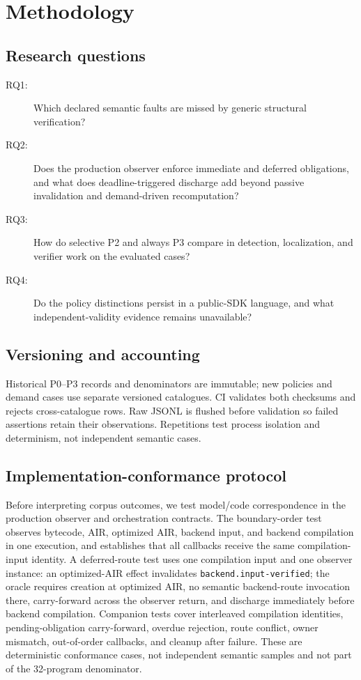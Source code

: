 \section{Methodology}
\subsection{Research questions}
\begin{description}
 \item[RQ1:] Which declared semantic faults are missed by generic structural verification?
 \item[RQ2:] Does the production observer enforce immediate and deferred obligations, and what does deadline-triggered discharge add beyond passive invalidation and demand-driven recomputation?
 \item[RQ3:] How do selective P2 and always P3 compare in detection, localization, and verifier work on the evaluated cases?
 \item[RQ4:] Do the policy distinctions persist in a public-SDK language, and what independent-validity evidence remains unavailable?
\end{description}

\subsection{Versioning and accounting}
Historical P0--P3 records and denominators are immutable; new policies and demand cases use separate versioned catalogues. CI validates both checksums and rejects cross-catalogue rows. Raw JSONL is flushed before validation so failed assertions retain their observations. Repetitions test process isolation and determinism, not independent semantic cases.

\subsection{Implementation-conformance protocol}
Before interpreting corpus outcomes, we test model/code correspondence in the production observer and orchestration contracts. The boundary-order test observes bytecode, AIR, optimized AIR, backend input, and backend compilation in one execution, and establishes that all callbacks receive the same compilation-input identity. A deferred-route test uses one compilation input and one observer instance: an optimized-AIR effect invalidates \texttt{backend.input-verified}; the oracle requires creation at optimized AIR, no semantic backend-route invocation there, carry-forward across the observer return, and discharge immediately before backend compilation. Companion tests cover interleaved compilation identities, pending-obligation carry-forward, overdue rejection, route conflict, owner mismatch, out-of-order callbacks, and cleanup after failure. These are deterministic conformance cases, not independent semantic samples and not part of the 32-program denominator.

